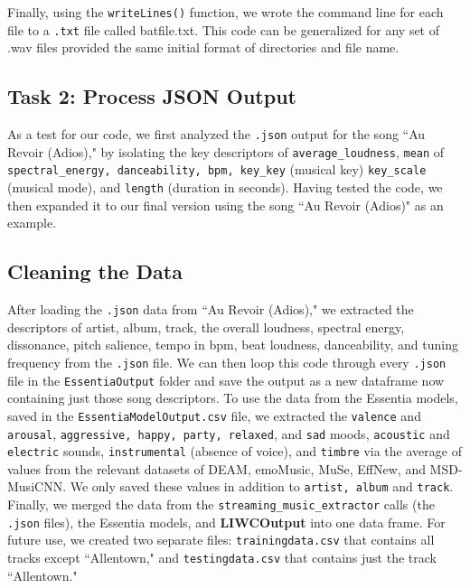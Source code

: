 \documentclass{article}\usepackage[]{graphicx}\usepackage[]{xcolor}
\begin{document}
\begin{multicols}{2}
Finally, using the \texttt{writeLines()} function, we wrote the command line for each file to a \texttt{.txt} file called batfile.txt. This code can be generalized for any set of .wav files provided the same initial format of directories and file name.










\subsection{Task 2: Process JSON Output}
As a test for our code, we first analyzed the \texttt{.json} output for the song ``Au Revoir (Adios)," by isolating the key descriptors of \texttt{average\_loudness}, \texttt{mean} of \texttt{spectral\_energy, danceability, bpm, key\_key} (musical key) \texttt{key\_scale} (musical mode), and \texttt{length} (duration in seconds). Having tested the code, we then expanded it to our final version using the song ``Au Revoir (Adios)" as an example. 

\subsection{Cleaning the Data}
  After loading the \texttt{.json} data from ``Au Revoir (Adios)," we extracted the descriptors of artist, album, track, the overall loudness, spectral energy, dissonance, pitch salience, tempo in bpm, beat loudness, danceability, and tuning frequency from the \texttt{.json} file. We can then loop this code through every \texttt{.json} file in the \texttt{EssentiaOutput} folder and save the output as a new dataframe now containing just those song descriptors. 
  To use the data from the Essentia models, saved in the \texttt{EssentiaModelOutput.csv} file, we extracted the \texttt{valence} and \texttt{arousal}, \texttt{aggressive, happy, party, relaxed}, and \texttt{sad} moods, \texttt{acoustic} and \texttt{electric} sounds, \texttt{instrumental} (absence of voice), and \texttt{timbre} via the average of values from the relevant datasets of DEAM, emoMusic, MuSe, EffNew, and MSD-MusiCNN. We only saved these values in addition to \texttt{artist, album} and \texttt{track}.
  Finally, we merged the data from the \texttt{streaming\_music\_extractor} calls (the \texttt{.json} files), the Essentia models, and \textbf{LIWCOutput} into one data frame. For future use, we created two separate files: \texttt{trainingdata.csv} that contains all tracks except ``Allentown," and \texttt{testingdata.csv} that contains just the track ``Allentown."
  



\end{multicols}
\end{document}
